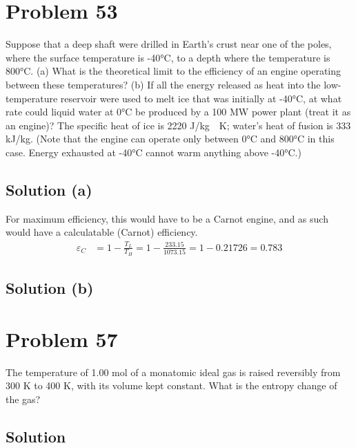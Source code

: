 \documentclass[12pt]{article}
\begin{document}
    \pagebreak
    \section{Problem 53}
        Suppose that a deep shaft were drilled in Earth's crust near one of the poles, where the surface temperature is -40\unit{\celsius}, to a depth where the temperature is 800°C. 
        (a) What is the theoretical limit to the efficiency of an engine operating between these temperatures?
        (b) If all the energy released as heat into the low-temperature reservoir were used to melt ice that was initially at -40\unit{\celsius}, at what rate could liquid water at 0\unit{\celsius} be produced by a 100 MW power plant (treat it as an engine)? 
        The specific heat of ice is 2220 \unit{\joule/\kilo\gram\cdot\kelvin}; water's heat of fusion is 333 \unit{\kilo\joule/\kilo\gram}. 
        (Note that the engine can operate only between 0\unit{\celsius} and 800\unit{\celsius} in this case. 
        Energy exhausted at -40\unit{\celsius} cannot warm anything above -40\unit{\celsius}.)

        \subsection{Solution (a)}
            For maximum efficiency, this would have to be a Carnot engine, and as such would have a calculatable (Carnot) efficiency. 
            \begin{align}
                \varepsilon_C   &=  1 - \frac{T_L}{T_H}
                    =   1 - \frac{233.15}{1073.15}
                    =   1 - 0.21726
                    =   \boxed{0.783}
            \end{align}

        \subsection{Solution (b)}

    \section{Problem 57}
        The temperature of 1.00 mol of a monatomic ideal gas is raised reversibly from 300 K to 400 K, with its volume kept constant. 
        What is the entropy change of the gas?

        \subsection{Solution}
\end{document}
